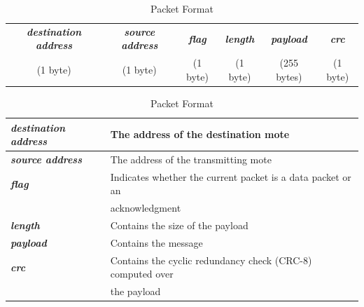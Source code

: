 \begin{table}[htbp]
\begin{center}
\begin{tabular}{|c|c|c|c|c|c|}
\hline 
\textit{\textbf{destination address}} & \textit{\textbf{source address}} & \textit{\textbf{flag}} & \textit{\textbf{length}} & \textit{\textbf{payload}} & \textit{\textbf{crc}} \\ 
(1 byte) & (1 byte) & (1 byte) & (1 byte) & (255 bytes) & (1 byte) \\ 
\hline 
\end{tabular}
\begin{tabular}{|l|l|}
\hline 
\textit{\textbf{destination address}} & The address of the destination mote \\ 
\hline 
\textit{\textbf{source address}} & The address of the transmitting mote \\ 
\hline 
\textit{\textbf{flag}} & Indicates whether the current packet is a data packet or an\\
 &  acknowledgment \\ 
\hline 
\textit{\textbf{length}} & Contains the size of the payload \\ 
\hline 
\textit{\textbf{payload}} & Contains the message \\ 
\hline 
\textit{\textbf{crc}} & Contains the cyclic redundancy check (CRC-8) computed over\\
 & the payload \\ 
\hline 
\end{tabular}
\caption{Packet Format}
\label{tab:packet_format}
\end{center}
\end{table}

